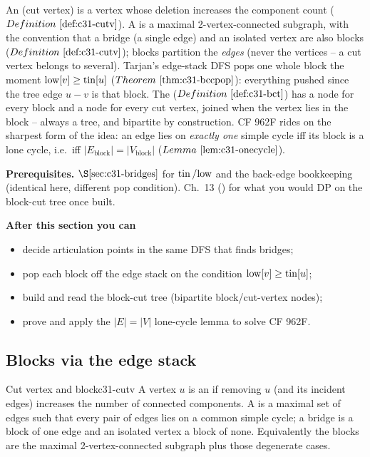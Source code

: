 \begin{topicintro}
An  (cut vertex) is a vertex whose deletion increases the
component count (\(\defref{c31-cutv}\)).  A  is a maximal
2-vertex-connected subgraph, with the convention that a bridge (a single edge) and
an isolated vertex are also blocks (\(\defref{c31-cutv}\)); blocks partition the
\emph{edges} (never the vertices -- a cut vertex belongs to several).  Tarjan's
edge-stack DFS pops one whole block the moment \(\mathrm{low}[v]\ge\operatorname{tin}[u]\)
(\(\thmref{c31-bccpop}\)): everything pushed since the tree edge \(u\!-\!v\) is that
block.  The  (\(\defref{c31-bct}\)) has a node for every block
and a node for every cut vertex, joined when the vertex lies in the block -- always
a tree, and bipartite by construction.  CF 962F rides on the sharpest form of the
idea: an edge lies on \emph{exactly one} simple cycle iff its block is a lone cycle,
i.e.\ iff \(|E_{\text{block}}|=|V_{\text{block}}|\) (\(\lemref{c31-onecycle}\)).

\textbf{Prerequisites.} \(\secref{c31-bridges}\) for \(\operatorname{tin}/\mathrm{low}\) and the
back-edge bookkeeping (identical here, different pop condition).  Ch.~13
() for what you would DP on the block-cut tree once built.

\textbf{After this section you can}
\begin{itemize}[nosep]
  \item decide articulation points in the same DFS that finds bridges; \hfill{}
  \item pop each block off the edge stack on the condition \(\mathrm{low}[v]\ge\operatorname{tin}[u]\); \hfill{}
  \item build and read the block-cut tree (bipartite block/cut-vertex nodes); \hfill{}
  \item prove and apply the \(|E|=|V|\) lone-cycle lemma to solve CF 962F. \hfill{}
\end{itemize}
\end{topicintro}

\subsection{Blocks via the edge stack}

\begin{definition}{Cut vertex and block}{c31-cutv}
A vertex \(u\) is an  if removing \(u\) (and its incident
edges) increases the number of connected components.  A  is a maximal
set of edges such that every pair of edges lies on a common simple cycle; a bridge
is a block of one edge and an isolated vertex a block of none.  Equivalently the
blocks are the maximal 2-vertex-connected subgraph plus those degenerate cases.
\end{definition}


